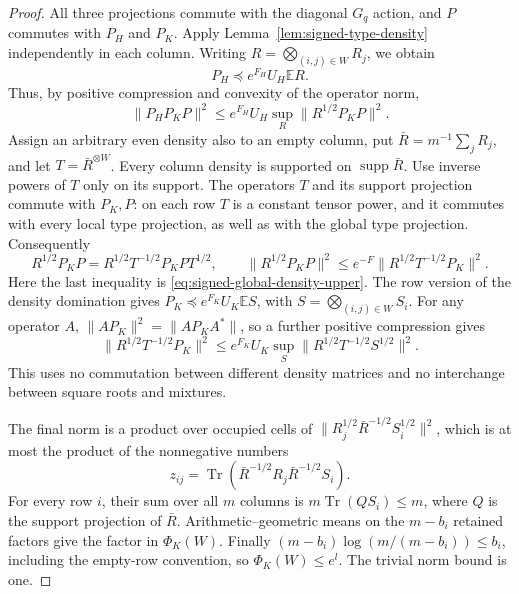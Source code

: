 \begin{proof}
All three projections commute with the diagonal $G_q$ action, and
$P$ commutes with $P_H$ and $P_K$. Apply
Lemma~\ref{lem:signed-type-density} independently in each column.
Writing $R=\bigotimes_{(i,j)\in W}R_j$, we obtain
\[
 P_H\preceq e^{F_H}U_H\mathbb E R.
\]
Thus, by positive compression and convexity of the operator norm,
\[
 \|P_HP_KP\|^2
 \le e^{F_H}U_H\sup_R\|R^{1/2}P_KP\|^2.
\]
Assign an arbitrary even density also to an empty column, put
$\bar R=m^{-1}\sum_jR_j$, and let $T=\bar R^{\otimes W}$.
Every column density is supported on $\operatorname{supp}\bar R$.
Use inverse powers of $T$ only on its support. The operators $T$ and
its support projection commute with $P_K,P$: on each row $T$ is a
constant tensor power, and it commutes with every local type
projection, as well as with the global type projection. Consequently
\[
 R^{1/2}P_KP
 =R^{1/2}T^{-1/2}P_KP T^{1/2},
 \qquad
 \|R^{1/2}P_KP\|^2
 \le e^{-F}\|R^{1/2}T^{-1/2}P_K\|^2.
\]
Here the last inequality is
\eqref{eq:signed-global-density-upper}. The row version of the
density domination gives $P_K\preceq e^{F_K}U_K\mathbb E S$, with
$S=\bigotimes_{(i,j)\in W}S_i$. For any operator $A$,
$\|AP_K\|^2=\|AP_KA^*\|$, so a further positive compression gives
\[
 \|R^{1/2}T^{-1/2}P_K\|^2
 \le e^{F_K}U_K\sup_S
     \|R^{1/2}T^{-1/2}S^{1/2}\|^2.
\]
This uses no commutation between different density matrices and no
interchange between square roots and mixtures.

The final norm is a product over occupied cells of
$\|R_j^{1/2}\bar R^{-1/2}S_i^{1/2}\|^2$, which is at most the
product of the nonnegative numbers
\[
 z_{ij}=\operatorname{Tr}
 (\bar R^{-1/2}R_j\bar R^{-1/2}S_i).
\]
For every row $i$, their sum over all $m$ columns is
$m\operatorname{Tr}(Q S_i)\le m$, where $Q$ is the support
projection of $\bar R$. Arithmetic--geometric means on the $m-b_i$
retained factors give the factor in $\Phi_K(W)$. Finally
$(m-b_i)\log(m/(m-b_i))\le b_i$, including the empty-row
convention, so $\Phi_K(W)\le e^l$. The trivial norm bound is one.
\end{proof}

